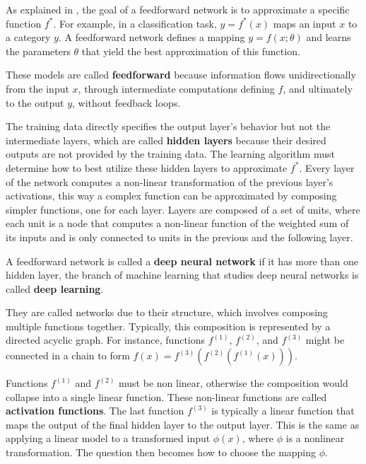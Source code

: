 As explained in 
\cite{goodfellow2016deep},
the goal of a feedforward network is to approximate a specific function
\( f^* \). For example, in a classification task,
\( y = f^*(x) \) maps an input \( x \) to a category \( y \).
A feedforward network defines a mapping \( y = f(x; \theta) \) and
learns the parameters \( \theta \) that yield the best approximation
of this function.

These models are called \textbf{feedforward} because information
flows unidirectionally from the input \( x \), through intermediate computations
defining \( f \), and ultimately to the output \( y \), without feedback loops.

The training data directly specifies the output layer's behavior but
not the intermediate layers, which are called \textbf{hidden layers}
because their desired outputs are not provided by the training data.
The learning algorithm must determine how to best utilize these
hidden layers to approximate \( f^* \).
Every layer of the network computes a non-linear transformation of the
previous layer's activations, this way a complex function can be
approximated by composing simpler functions, one for each layer.
Layers are composed of a set of units, where each unit is a node that
computes a non-linear function of the weighted sum of its inputs
and is only connected to units in the previous and the following layer.

A feedforward network is called a \textbf{deep neural network} if it has
more than one hidden layer, the branch of machine learning that studies
deep neural networks is called \textbf{deep learning}.

They are called networks due to their structure, which involves composing
multiple functions together. Typically, this composition is represented
by a directed acyclic graph. For instance, functions
\( f^{(1)} \), \( f^{(2)} \), and \( f^{(3)} \) might be connected in
a chain to form \( f(x) = f^{(3)}(f^{(2)}(f^{(1)}(x))) \).

Functions \( f^{(1)} \) and \( f^{(2)} \) must
be non linear, otherwise the composition would collapse into a single
linear function. These non-linear functions are
called \textbf{activation functions}.
The last function \( f^{(3)} \) is typically a linear function that maps
the output of the final hidden layer to the output layer.
This is the same as applying a linear model to a transformed
input \( \phi(x) \), where \( \phi \) is a nonlinear transformation.
The question then becomes how to choose the mapping \( \phi \).

